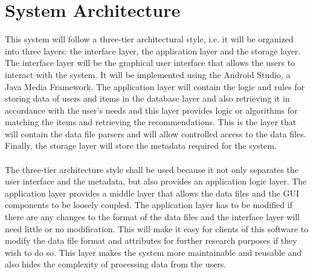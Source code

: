 \documentclass[a4paper,12pt]{article}
\begin{document}
\section{System Architecture}
This system will follow a three-tier architectural style, i.e. it will be organized into three layers: the interface layer, the application layer and the storage layer. The interface layer will be the graphical user interface that allows the users to interact with the system. It will be implemented using the Android Studio, a Java Media Framework. The application layer will contain the logic and rules for storing data of users and items in the database layer and also retrieving it in accordance with the user's needs and this layer provides logic or algorithms for matching the items and retrieving the recommendations. This is the layer that will contain the data file parsers and will allow controlled access to the data files. Finally, the storage layer will store the metadata required for the system.
\paragraph{}
The three-tier architecture style shall be used because it not only separates the user interface and the metadata, but also provides an application logic layer. The application layer provides a middle layer that allows the data files and the GUI components to be loosely coupled. The application layer has to be modified if there are any changes to the format of the data files and the interface layer will need little or no modification. This will make it easy for clients of this software to modify the data file format and attributes for further research purposes if they wish to do so. This layer makes the system more maintainable and reusable and also hides the complexity of processing data from the users.
\end{document}
